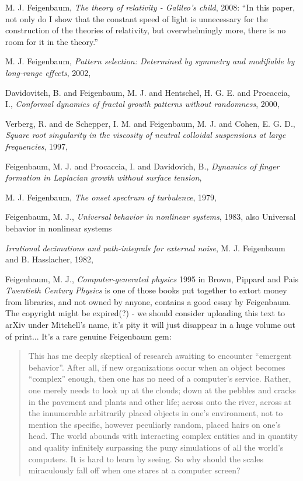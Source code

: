 \begin{description}
{M. J. Feigenbaum},
{\em The theory of relativity - {Galileo's} child},
{2008}:
``In this paper, not only do I show that the constant speed of light is
unnecessary for the construction of the theories of relativity, but
overwhelmingly more, there is no room for it in the theory.''

{M. J. Feigenbaum},
{\em Pattern selection: {Determined} by symmetry and modifiable by long-range effects},
{2002},

{Davidovitch, B. and Feigenbaum, M. J. and Hentschel, H. G. E. and Procaccia, I.},
  {\em Conformal dynamics of fractal growth patterns without randomness},
{2000},

{Verberg, R. and de Schepper, I. M. and Feigenbaum, M. J. and Cohen, E. G. D.},
  {\em Square root singularity in the viscosity of neutral colloidal suspensions at large frequencies},
{1997},

{Feigenbaum, M. J. and Procaccia, I. and Davidovich, B.},
  {\em Dynamics of finger formation in {Laplacian} growth without surface tension},

{M. J. Feigenbaum},
{\em The onset spectrum of turbulence},
{1979},

{Feigenbaum, M. J.},
{\em Universal behavior in nonlinear systems},
{1983},
also
{Universal behavior in nonlinear systems}

{\em Irrational decimations and path-integrals for external noise},
{M. J. Feigenbaum and B. Hasslacher},
{1982},

{Feigenbaum, M. J.},
{\em Computer-generated physics}
1995 in {Brown, Pippard  and Pais}
{\em {Twentieth Century Physics}}
is one of those books put together to extort money from libraries, and
not owned by anyone, contains a good essay by Feigenbaum. The copyright
might be expired(?) - we should consider uploading this text to arXiv
under Mitchell's name, it's pity it will just disappear in a huge volume
out of print... It's a rare genuine Feigenbaum gem:

\begin{quote}
This has me deeply skeptical of research awaiting to encounter ``emergent
behavior''. After all, if new organizations occur when an object becomes
``complex'' enough, then one has no need of a computer's service. Rather,
one merely needs to look up at the clouds; down at the pebbles and cracks
in the pavement and plants and other life; across onto the river, across
at the innumerable arbitrarily placed objects in one's environment, not
to mention the specific, however peculiarly random, placed hairs on one's
head. The world abounds with interacting complex entities and in quantity
and quality infinitely surpassing the puny simulations of all the world's
computers. It is hard to learn by seeing. So why should the scales
miraculously fall off when one stares at a computer screen?


\end{quote}
\end{description}
